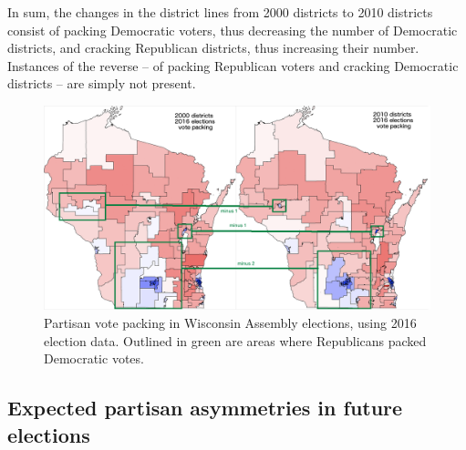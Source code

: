 \documentclass[preprint,12pt]{article}
\begin{document}
In sum, the changes in the district lines from 2000 districts to 2010 districts consist of packing Democratic voters, thus decreasing the number of Democratic districts, and cracking Republican districts, thus increasing their number.
Instances of the reverse -- of packing Republican voters and cracking Democratic districts -- are simply not present.
\begin{figure}[htb!]
    \begin{center}
        \includegraphics[scale=0.40]{../Figures/WI_compared/districts_compared_deltas.png}
        \caption{Partisan vote packing in Wisconsin Assembly elections, using 2016 election data.  Outlined in green are areas where Republicans packed Democratic votes.}\label{fig:DistrictMapDelta}
    \end{center}
\end{figure}



\subsection{Expected  partisan asymmetries in future elections}
\end{document}

